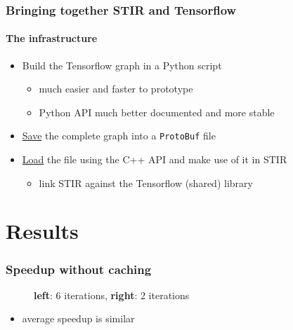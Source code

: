 \documentclass{beamer}
\begin{document}
\begin{frame}
  \frametitle{Bringing together STIR and Tensorflow}
  \framesubtitle{The infrastructure}
  \begin{itemize}
    \item Build the Tensorflow graph in a Python script
      \begin{itemize}
        \item much easier and faster to prototype
        \item Python API much better documented and more stable
      \end{itemize}
    \item \underline{Save} the complete graph into a \texttt{ProtoBuf} file
    \item \underline{Load} the file using the C++ API and make use of it in STIR
      \begin{itemize}
        \item link STIR against the Tensorflow (shared) library
      \end{itemize}
  \end{itemize}
\end{frame}

\section{Results}
\begin{frame}
  \frametitle{Speedup without caching}
  \begin{figure}
    \centering
      \caption{\textbf{left}: 6 iterations, \textbf{right}: 2 iterations}
  \end{figure}
  
  \begin{itemize}
    \item average speedup is similar
  \end{itemize}
\end{frame}
\end{document}
